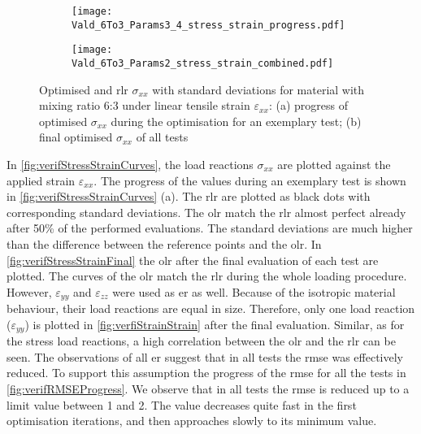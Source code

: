 \begin{figure}[H]
\centering
\begin{subfigure}[t]{0.495\textwidth}
    \centering
    \texttt{[image: Vald\_6To3\_Params3\_4\_stress\_strain\_progress.pdf]}
    \caption{}
    \label{fig:verifStressStrainProgress}
\end{subfigure}
\hfill
\begin{subfigure}[t]{0.495\textwidth}
    \centering
    \texttt{[image: Vald\_6To3\_Params2\_stress\_strain\_combined.pdf]}
    \caption{}
    \label{fig:verifStressStrainFinal}
\end{subfigure}
\caption{Optimised and \acrfull{rlr} $\sigma_{xx}$ with standard deviations for material with mixing ratio 6:3 under linear tensile strain $\varepsilon_{xx}$: (a) progress of optimised $\sigma_{xx}$ during the optimisation for an exemplary test; (b) final optimised $\sigma_{xx}$ of all tests}
\label{fig:verifStressStrainCurves}
\end{figure}

In \autoref{fig:verifStressStrainCurves}, the load reactions $\sigma_{xx}$ are plotted against the applied strain $\varepsilon_{xx}$. The progress of the values during an exemplary test is shown in \autoref{fig:verifStressStrainCurves} (a). The \acrlong{rlr} are plotted as black dots with corresponding standard deviations. The \acrlong{olr} match the \acrlong{rlr} almost perfect already after 50\% of the performed evaluations. The standard deviations are much higher than the difference between the reference points and the \acrlong{olr}. In \autoref{fig:verifStressStrainFinal} the \acrlong{olr} after the final evaluation of each test are plotted.
The curves of the \acrlong{olr} match the \acrlong{rlr} during the whole loading procedure.
However, $\varepsilon_{yy}$ and $\varepsilon_{zz}$ were used as \acrlong{er} as well. Because of the isotropic material behaviour, their load reactions are equal in size. Therefore, only one load reaction ($\varepsilon_{yy}$) is plotted in \autoref{fig:verfiStrainStrain} after the final evaluation. Similar, as for the stress load reactions, a high correlation between the \acrlong{olr} and the \acrlong{rlr} can be seen. The observations of all \acrlong{er} suggest that in all tests the \acrshort{rmse} was effectively reduced. To support this assumption the progress of the \acrshort{rmse} for all the tests in \autoref{fig:verifRMSEProgress}. We observe that in all tests the \acrshort{rmse} is reduced up to a limit value between 1 and 2. The value decreases quite fast in the first optimisation iterations, and then approaches slowly to its minimum value.

